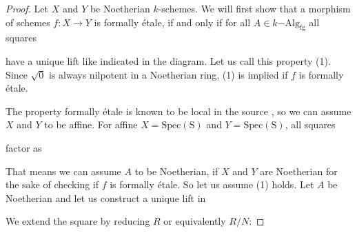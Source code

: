 \documentclass[9pt,twosided]{amsart}
\newcommand{\fgkAlg}{\ensuremath{k\mathrm{-Alg}_{\mathrm{fg}}}}
\begin{document}
\begin{proof}
  Let $X$ and $Y$ be Noetherian $k$-schemes. 
  We will first show that a morphism of schemes $f:X\to Y$ is formally étale,
  if and only if for all $A\in\fgkAlg$ all squares
  \begin{center}
  \end{center}
  have a unique lift like indicated in the diagram. Let us call this property (1).
  Since $\sqrt{0}$ is always nilpotent in a Noetherian ring, (1) is implied if $f$ is formally étale.
  
  The property formally étale is known to be local in the source \cite[§ 17.1.6]{GrothendieckDieudonne}, so we can assume $X$ and $Y$ to be affine.
  For affine $X=\mathrm{Spec(S)}$ and $Y=\mathrm{Spec(S)}$, all squares
  \begin{center}
  \end{center}
  factor as 
  \begin{center}
  \end{center}
  That means we can assume $A$ to be Noetherian, if $X$ and $Y$ are Noetherian for the sake of checking if $f$ is formally étale.
  So let us assume (1) holds. Let $A$ be Noetherian and let us construct a unique lift in
  \begin{center}
  \end{center}
  We extend the square by reducing $R$ or equivalently $R/N$:

\end{proof}
\end{document}

